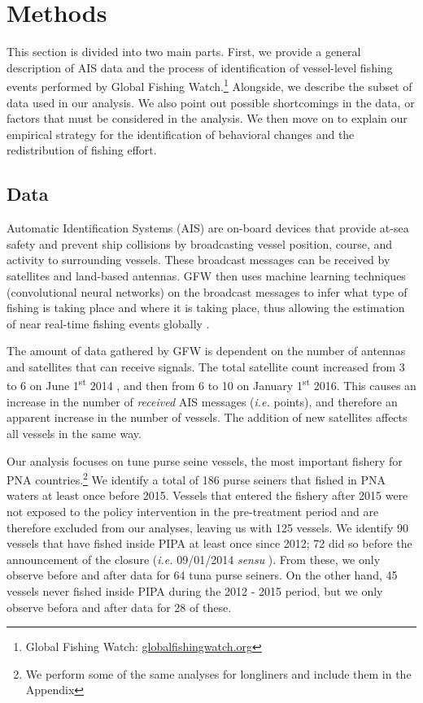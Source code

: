 \documentclass[9pt,twoside,lineno]{pnas-new}
\begin{document}
\clearpage

\section{Methods}\label{methods}

This section is divided into two main parts. First, we provide a general
description of AIS data and the process of identification of
vessel-level fishing events performed by Global Fishing Watch.\footnote{Global Fishing Watch: \url{globalfishingwatch.org}}
Alongside, we describe
the subset of data used in our analysis. We also point
out possible shortcomings in the data, or factors that must be
considered in the analysis. We then move on to explain our
empirical strategy for the identification of behavioral changes and
the redistribution of fishing effort.

\subsection{Data}\label{data}

Automatic Identification Systems (AIS) are on-board devices that provide
at-sea safety and prevent ship collisions by broadcasting vessel
position, course, and activity to surrounding vessels. These broadcast
messages can be received by satellites and land-based antennas. GFW then uses 
machine learning techniques (convolutional neural networks) on the broadcast messages
to infer what type of fishing is taking place and where it is taking place, thus
allowing the estimation of near real-time fishing events globally \citep{kroodsma_2018}.

The amount of data gathered by GFW is dependent on the number of antennas and
satellites that can receive signals. The total satellite count increased from 3 to 6 on 
June 1\textsuperscript{st}
2014 , and then from 6 to 10 on January
1\textsuperscript{st} 2016. This causes an increase in the number of
\emph{received} AIS messages (\emph{i.e.} points), and therefore an
apparent increase in the number of vessels.
The addition of new satellites affects all vessels in the same way. 

Our analysis focuses on tune purse seine vessels, the most important fishery
for PNA
countries.\footnote{We perform some of the same analyses for longliners and include them in the Appendix}
We identify a total of 186 purse seiners that fished in PNA waters at
least once before 2015. Vessels that entered the fishery after 2015 were not
exposed to the policy intervention in the pre-treatment period and are
therefore excluded from our analyses, leaving us with 125 vessels.
We identify 90 vessels that have fished inside PIPA
at least once since 2012; 72 did so before the announcement
of the closure (\emph{i.e.} 09/01/2014 \emph{sensu} \citep{mcdermott_2018}).
From these, we only observe before and after data for 64 tuna purse seiners.
On the other hand, 45 vessels never fished inside PIPA during the 2012 - 2015 period, 
but we only observe befora and after data for 28 of these.
\end{document}
